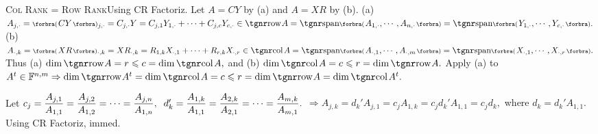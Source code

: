 \SepLine

\BulletPointX\textsc{Col Rank = Row Rank}\quad Using CR Factoriz. Let $A=CY$ by (a) and $A=XR$ by (b).\TextB{}
(a) $A_{j,\cdot}=\BigPar{CY}{_{j,\cdot}}=C_{j,\cdot}Y=C_{j,1}Y_{1,\cdot}+\dots+C_{j,c}Y_{c,\cdot}\in\row A=\Span[\BigPar]{A_{1,\cdot},\cdots,A_{n,\cdot}}=\Span[\BigPar]{Y_{1,\cdot},\cdots,Y_{c,\cdot}}.$\TextB{}
(b) $A_{\cdot,k}=\BigPar{XR}{_{\cdot,k}}=XR_{\cdot,k}=R_{1,k}X_{\cdot,1}+\dots+R_{r,k}X_{\cdot,r}\in\col A=\Span[\BigPar]{A_{\cdot,1},\cdots,A_{\cdot,m}}=\Span[\BigPar]{X_{\cdot,1},\cdots,X_{\cdot,r}}.$\TextB{}
Thus (a) $\dim\row A=r\leqslant c=\dim\col A,$ and (b) $\dim\col A=c\leqslant r=\dim\row A.$\vspace{2pt}\PfEnd\TextB{}
\Or Apply (a) to $A^t\in\Fbb^{n,m}\Rightarrow\dim\row A^t=\dim\col A=c\leqslant r=\dim\row A=\dim\col A^t.$\PfEnd
\SepLine

Let $c_j={\displaystyle{\frac{A_{j,1}}{A_{1,1}}}}={\displaystyle{\frac{A_{j,2}}{A_{1,2}}}}=\dots={\displaystyle{\frac{A_{j,n}}{A_{1,n}}}},\;\;d_k'={\displaystyle{\frac{A_{1,k}}{A_{1,1}}}}={\displaystyle{\frac{A_{2,k}}{A_{2,1}}}}=\dots={\displaystyle{\frac{A_{m,k}}{A_{m,1}}}}.$\vspace{4pt}\parSol{}
{$\Rightarrow A_{j,k}=d_k' A_{j,1}=c_j A_{1,k}=c_j d_k' A_{1,1}=c_j d_k,$ where $d_k=d_k' A_{1,1}.$}\quad\Or Using CR Factoriz, immed.\PfEnd
\SepLine

